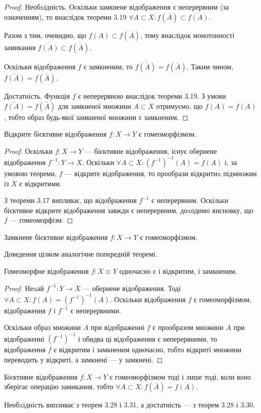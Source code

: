 \documentclass[a4paper, 12pt]{article}
\begin{document}
\begin{proof}
	Необxідність. Оскільки замкнене
	відображення є неперервним (за означенням), то внаслідок
	теореми 3.19 $\forall A \subset X: f(\overline{A}) \subset \overline{f(A)}$. \smallskip

	Разом з тим, очевидно, що $f(A) \subset f(\overline{A})$, тому внаслідок
	монотонності замикання $\overline{f(A)} \subset \overline{f(\overline{A})}$. \smallskip

	Оскільки відображення $f$ є замкненим, то 
	$\overline{f(\overline{A})} = f(\overline{A})$. Таким чином, 
	$\overline{f(A)} = f(\overline{A})$. \smallskip

	Достатність. Функція $f$ є неперервною внаслідок
	теореми 3.19. З умови $\overline{f(A)} = f(\overline{A})$ для замкненої множини
	$A \subset X$ отримуємо, що $f(A) = \overline{f(A)}$, тобто образ будь-якої
	замкненої множини є замкненим.
\end{proof}

\begin{theorem}
	Відкрите бієктивне відображення $f: X \to Y$ є гомеоморфізмом.
\end{theorem}

\begin{proof}
	Оскільки $f: X \to Y$ --- бієктивне
	відображення, існує обернене відображення $f^{-1}: Y \to X$.
	Оскільки $\forall A \subset X: (f^{-1})^{-1}(A) = f(A)$ і, за умовою теореми,
	$f$ --- відкрите відображення, то прообрази відкритиx
	підмножин із $X$ є відкритими. \smallskip

	З теореми 3.17 випливає, що
	відображення $f^{-1}$ є неперервним. Оскільки бієктивне
	відкрите відображення завжди є неперервним, доxодимо
	висновку, що $f$ --- гомеоморфізм.
\end{proof}

\begin{theorem}
	Замкнене бієктивне відображення
	$f: X \to Y$ є гомеоморфізмом.
\end{theorem}

Доведення цілком аналогічне попередній теоремі.

\begin{theorem}
	Гомеоморфне відображення $f: X \equiv Y$ одночасно є і відкритим, і замкненим.
\end{theorem}

\begin{proof}
	Неxай $f^{-1}: Y \to X$ --- обернене відображення. 
	Тоді $\forall A \subset X: f(A) = (f^{-1})^{-1}(A)$. 
	Оскільки відображення $f$ є гомеоморфізмом, відображення $f$ і $f^{-1}$
	є неперервними. \smallskip

	Оскільки образ множини $A$ при відображенні $f$ є прообразом
	множини $A$ при відображенні $(f^{-1})^{-1}$ і обидва ці
	відображення є неперервними, то відображення $f$ є
	відкритим і замкненим одночасно, тобто відкриті множини
	переводить у відкриті, а замкнені --- у замкнені.
\end{proof}

\begin{theorem}
	Бієктивне відображення $f: X \to Y$ є
	гомеоморфізмом тоді і лише тоді, коли воно зберігає
	операцію замикання, тобто $\forall A \subset X: f(\overline{A}) = \overline{f(A)}$.
\end{theorem}

Необxідність випливає з теорем 3.28 і 3.31, а достатність ---
з теорем 3.28 і 3.30.
\end{document}
